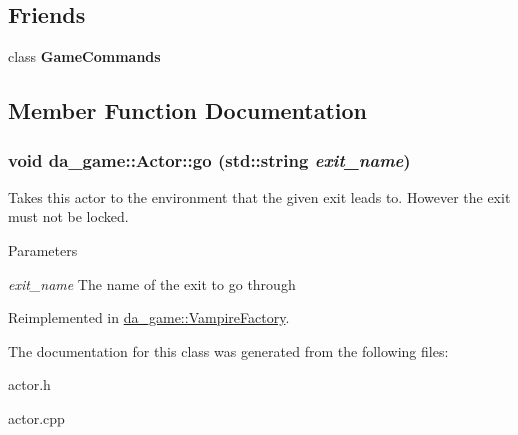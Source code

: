 \subsection*{Friends}
\begin{DoxyCompactItemize}
\item 
\hypertarget{classda__game_1_1Actor_ad58162d418e52e78ef2d13bea08472d4}{
class {\bfseries GameCommands}}
\label{classda__game_1_1Actor_ad58162d418e52e78ef2d13bea08472d4}

\end{DoxyCompactItemize}


\subsection{Member Function Documentation}
\hypertarget{classda__game_1_1Actor_a6be7923ecbacabf779eda60f1f78bb72}{
\subsubsection[{go}]{\setlength{\rightskip}{0pt plus 5cm}void da\_\-game::Actor::go (std::string {\em exit\_\-name})}}
\label{classda__game_1_1Actor_a6be7923ecbacabf779eda60f1f78bb72}
Takes this actor to the environment that the given exit leads to. However the exit must not be locked.


\begin{DoxyParams}{Parameters}
\item[{\em exit\_\-name}]The name of the exit to go through \end{DoxyParams}


Reimplemented in \hyperlink{classda__game_1_1VampireFactory_ab8f8fffebef4af1a90d00a0f011b245b}{da\_\-game::VampireFactory}.

The documentation for this class was generated from the following files:\begin{DoxyCompactItemize}
\item 
actor.h\item 
actor.cpp\end{DoxyCompactItemize}
